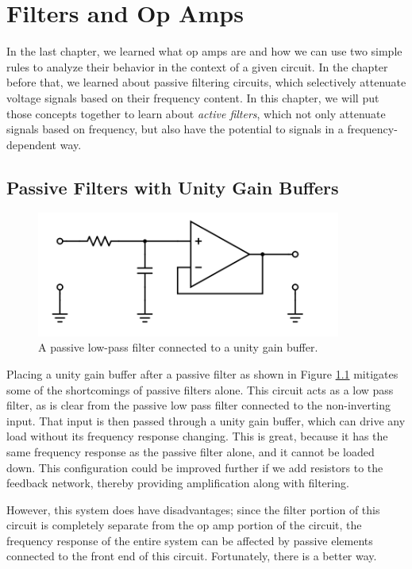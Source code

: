 \chapter{Filters and Op Amps}
In the last chapter, we learned what op amps are and how we can use two simple rules to analyze their behavior in the context of a given circuit. In the chapter before that, we learned about passive filtering circuits, which selectively attenuate voltage signals based on their frequency content. In this chapter, we will put those concepts together to learn about \textit{active filters}, which not only attenuate signals based on frequency, but also have the potential to  signals in a frequency-dependent way.
\section{Passive Filters with Unity Gain Buffers}
\begin{figure}[h!]
\centering
\includegraphics[width=10cm]{figures/bufferedLP.png}
\caption{A passive low-pass filter connected to a unity gain buffer.}
\label{bufferedLP}
\end{figure}

Placing a unity gain buffer after a passive filter as shown in Figure \ref{bufferedLP} mitigates some of the shortcomings of passive filters alone. This circuit acts as a low pass filter, as is clear from the passive low pass filter connected to the non-inverting input. That input is then passed through a unity gain buffer, which can drive any load without its frequency response changing. This is great, because it has the same frequency response as the passive filter alone, and it cannot be loaded down. This configuration could be improved further if we add resistors to the feedback network, thereby providing amplification along with filtering. 
\par
However, this system does have disadvantages; since the filter portion of this circuit is completely separate from the op amp portion of the circuit, the frequency response of the entire system can be affected by passive elements connected to the front end of this circuit. Fortunately, there is a better way.
